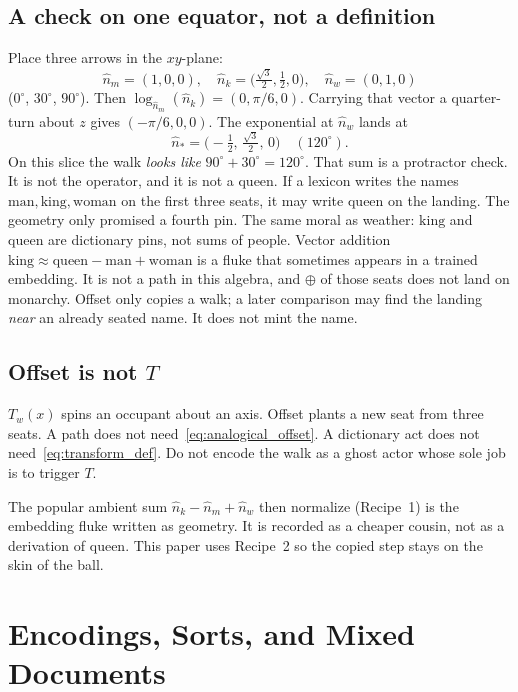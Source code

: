 \documentclass[12pt, a4paper]{article}
\begin{document}
\subsection{A check on one equator, not a definition}
\label{subsec:offset_equator}
Place three arrows in the $xy$-plane:
\[
\hat n_m=(1,0,0),\quad
\hat n_k=\bigl(\tfrac{\sqrt{3}}{2},\tfrac12,0\bigr),\quad
\hat n_w=(0,1,0)
\]
($0^\circ$, $30^\circ$, $90^\circ$). Then
$\log_{\hat n_m}(\hat n_k)=(0,\pi/6,0)$. Carrying that vector a
quarter-turn about $z$ gives $(-\pi/6,0,0)$. The exponential at
$\hat n_w$ lands at
\[
\hat n_{*}=\bigl(-\tfrac12,\,\tfrac{\sqrt{3}}{2},\,0\bigr)
\quad (120^\circ).
\]
On this slice the walk \emph{looks like} $90^\circ+30^\circ=120^\circ$.
That sum is a protractor check. It is not the operator, and it is
not a queen. If a lexicon writes the names
$\mathrm{man},\mathrm{king},\mathrm{woman}$ on the first three seats,
it may write $\mathrm{queen}$ on the landing. The geometry only
promised a fourth pin.
The same moral as weather: $\mathrm{king}$ and $\mathrm{queen}$
are dictionary pins, not sums of people. Vector addition
$\mathrm{king}\approx\mathrm{queen}-\mathrm{man}+\mathrm{woman}$
is a fluke that sometimes appears in a trained embedding. It is
not a path in this algebra, and $\oplus$ of those seats does not
land on monarchy. Offset only copies a walk; a later comparison
may find the landing \emph{near} an already seated name. It does
not mint the name.

\subsection{Offset is not $T$}
\label{subsec:offset_not_T}
$T_w(x)$ spins an occupant about an axis. Offset plants a new seat
from three seats. A path does not need~\eqref{eq:analogical_offset}.
A dictionary act does not need~\eqref{eq:transform_def}. Do not
encode the walk as a ghost actor whose sole job is to trigger $T$.

The popular ambient sum $\hat n_k-\hat n_m+\hat n_w$ then
normalize (Recipe~1) is the embedding fluke written as geometry.
It is recorded as a cheaper cousin, not as a derivation of
$\mathrm{queen}$. This paper uses Recipe~2 so the copied step
stays on the skin of the ball.

\section{Encodings, Sorts, and Mixed Documents}
\label{sec:encodings_sorts}
\end{document}
